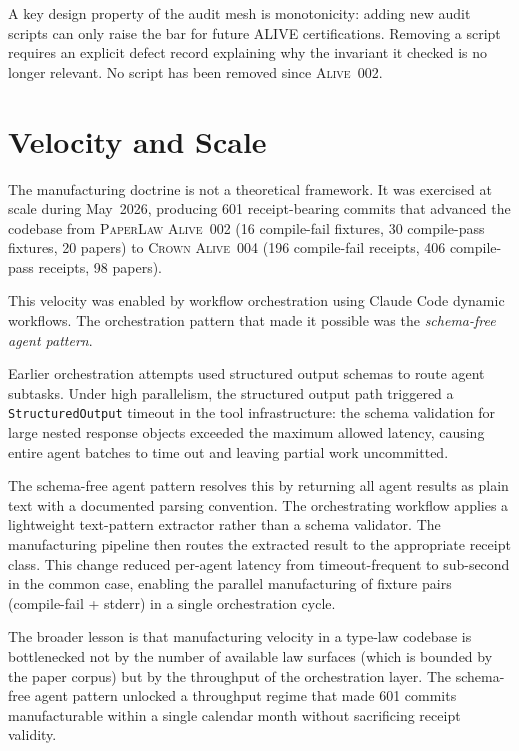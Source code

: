 A key design property of the audit mesh is monotonicity: adding new audit scripts can only
raise the bar for future ALIVE certifications. Removing a script requires an explicit
defect record explaining why the invariant it checked is no longer relevant. No script has
been removed since \textsc{Alive~002}.

\section{Velocity and Scale}
\label{sec:doctrine-velocity}

The manufacturing doctrine is not a theoretical framework. It was exercised at scale during
May~2026, producing 601 receipt-bearing commits that advanced the codebase from
\textsc{PaperLaw Alive~002} (16 compile-fail fixtures, 30 compile-pass fixtures, 20 papers)
to \textsc{Crown Alive~004} (196 compile-fail receipts, 406 compile-pass receipts, 98
papers).

This velocity was enabled by workflow orchestration using Claude Code dynamic workflows.
The orchestration pattern that made it possible was the \emph{schema-free agent pattern}.

Earlier orchestration attempts used structured output schemas to route agent subtasks.
Under high parallelism, the structured output path triggered a \texttt{StructuredOutput}
timeout in the tool infrastructure: the schema validation for large nested response objects
exceeded the maximum allowed latency, causing entire agent batches to time out and leaving
partial work uncommitted.

The schema-free agent pattern resolves this by returning all agent results as plain text
with a documented parsing convention. The orchestrating workflow applies a lightweight
text-pattern extractor rather than a schema validator. The manufacturing pipeline then
routes the extracted result to the appropriate receipt class. This change reduced per-agent
latency from timeout-frequent to sub-second in the common case, enabling the parallel
manufacturing of fixture pairs (compile-fail + stderr) in a single orchestration cycle.

The broader lesson is that manufacturing velocity in a type-law codebase is bottlenecked
not by the number of available law surfaces (which is bounded by the paper corpus) but by
the throughput of the orchestration layer. The schema-free agent pattern unlocked a
throughput regime that made 601 commits manufacturable within a single calendar month
without sacrificing receipt validity.

